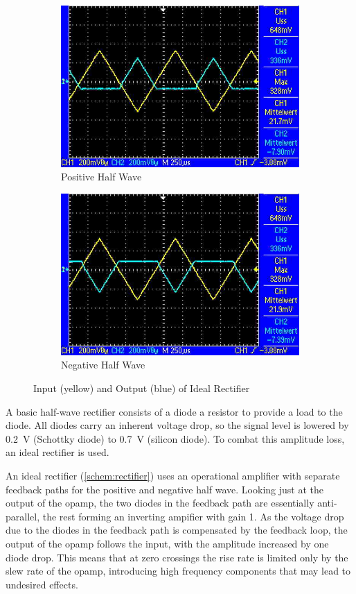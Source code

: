 \begin{figure}
	\centering
	\begin{subfigure}{0.4\textwidth}
		\centering
		\includegraphics[width=.9\linewidth]{./img/ss-rect-pos}
		\caption{Positive Half Wave}
	\end{subfigure}
	\begin{subfigure}{0.4\textwidth}
		\centering
		\includegraphics[width=.9\linewidth]{./img/ss-rect-neg}
		\caption{Negative Half Wave}
	\end{subfigure}
	\caption{Input (yellow) and Output (blue) of Ideal Rectifier}
	\label{ss:rect}
\end{figure}

A basic half-wave rectifier consists of a diode a resistor to provide a load to the diode.
All diodes carry an inherent voltage drop, so the signal level is lowered by \SI{0.2}{\volt} (Schottky diode) to \SI{0.7}{\volt} (silicon diode).
To combat this amplitude loss, an ideal rectifier is used.

An ideal rectifier (\autoref{schem:rectifier}) uses an operational amplifier with separate feedback paths for the positive and negative half wave.
Looking just at the output of the opamp, the two diodes in the feedback path are essentially anti-parallel, the rest forming an inverting ampifier with gain 1.
As the voltage drop due to the diodes in the feedback path is compensated by the feedback loop, the output of the opamp follows the input, with the amplitude increased by one diode drop.
This means that at zero crossings the rise rate is limited only by the slew rate of the opamp, introducing high frequency components that may lead to undesired effects.


